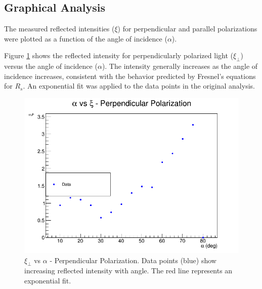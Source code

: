 \documentclass[journal]{IEEEtran}
\begin{document}
\subsection{Graphical Analysis}
The measured reflected intensities ($\xi$) for perpendicular and parallel polarizations were plotted as a function of the angle of incidence ($\alpha$).

Figure \ref{fig:perpendicular} shows the reflected intensity for perpendicularly polarized light ($\xi_{\perp}$) versus the angle of incidence ($\alpha$). The intensity generally increases as the angle of incidence increases, consistent with the behavior predicted by Fresnel's equations for $R_s$. An exponential fit was applied to the data points in the original analysis.

\begin{figure}[H]
    \centering
    \includegraphics[width=\linewidth]{../plots/perpendicular_plot.png}
    \caption{$\xi_{\perp}$ vs $\alpha$ - Perpendicular Polarization. Data points (blue) show increasing reflected intensity with angle. The red line represents an exponential fit.}
    \label{fig:perpendicular}
\end{figure}
\end{document}
